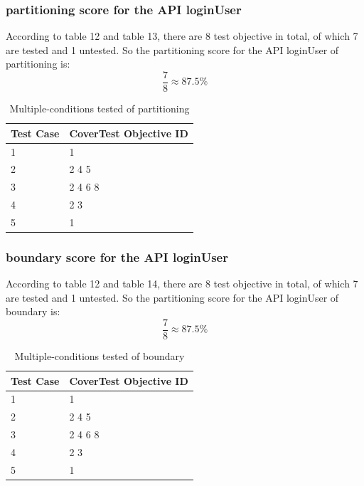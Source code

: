 \documentclass{article}
\begin{document}
\subsubsection{partitioning score for the API loginUser}
According to table 12 and table 13, there are 8 test objective in total, of which 7 are tested and 1 untested. So the partitioning score for the API loginUser of partitioning is:
$$\frac{7}{8}\approx87.5\%$$
\begin{longtable}{|p{2cm}|p{8cm}|}
\caption{Multiple-conditions tested of partitioning}\\
\hline 
Test Case& CoverTest Objective ID\\
\hline  
1&1\\
\hline
2&2 4 5\\
\hline
3&2 4 6 8\\
\hline
4&2 3\\
\hline
5&1\\
\hline
\end{longtable}
\subsubsection{boundary score for the API loginUser}
According to table 12 and table 14, there are 8 test objective in total, of which 7 are tested and 1 untested. So the partitioning score for the API loginUser of boundary is:
$$\frac{7}{8}\approx87.5\%$$
\begin{longtable}{|p{2cm}|p{8cm}|}
\caption{Multiple-conditions tested of boundary}\\
\hline 
Test Case& CoverTest Objective ID\\
\hline  
1&1\\
\hline
2&2 4 5\\
\hline
3&2 4 6 8\\
\hline
4&2 3\\
\hline
5&1\\
\hline
\end{longtable}
\end{document}
